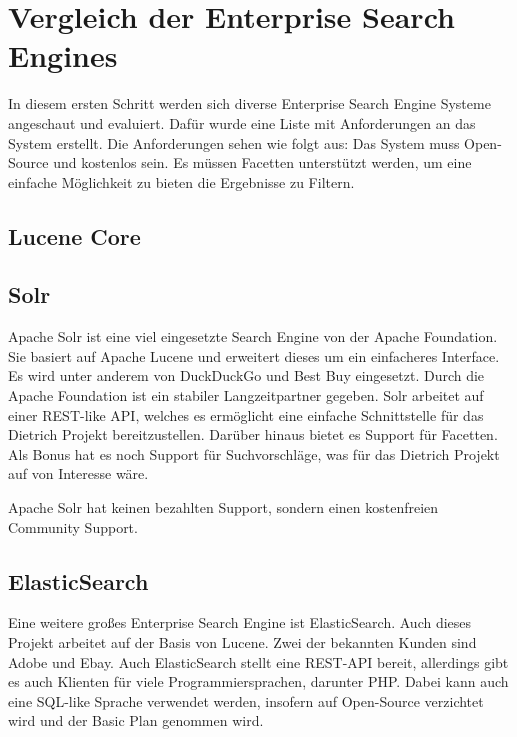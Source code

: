 \chapter{Vergleich der Enterprise Search Engines}

In diesem ersten Schritt werden sich diverse Enterprise Search Engine Systeme angeschaut und evaluiert. Dafür wurde eine Liste mit Anforderungen an das System erstellt. Die Anforderungen sehen wie folgt aus:
Das System muss Open-Source und kostenlos sein. Es müssen Facetten unterstützt werden, um eine einfache Möglichkeit zu bieten die Ergebnisse zu Filtern.

\section{Lucene Core}

\section{Solr}

Apache Solr ist eine viel eingesetzte Search Engine von der Apache Foundation. Sie basiert auf Apache Lucene und erweitert dieses um ein einfacheres Interface. Es wird unter anderem von DuckDuckGo und Best Buy eingesetzt. Durch die Apache Foundation ist ein stabiler Langzeitpartner gegeben. 
Solr arbeitet auf einer REST-like API, welches es ermöglicht eine einfache Schnittstelle für das Dietrich Projekt bereitzustellen. Darüber hinaus bietet es Support für Facetten.
Als Bonus hat es noch Support für Suchvorschläge, was für das Dietrich Projekt auf von Interesse wäre.

Apache Solr hat keinen bezahlten Support, sondern einen kostenfreien Community Support.

\cite{TheApacheSoftwareFoundation.2019}

\section{ElasticSearch}

Eine weitere großes Enterprise Search Engine ist ElasticSearch. Auch dieses Projekt arbeitet auf der Basis von Lucene. Zwei der bekannten Kunden sind Adobe und Ebay. Auch ElasticSearch stellt eine REST-API bereit, allerdings gibt es auch Klienten für viele Programmiersprachen, darunter PHP. Dabei kann auch eine SQL-like Sprache verwendet werden, insofern auf Open-Source verzichtet wird und der Basic Plan genommen wird. \cite{ElasticSearchSub.2019}

